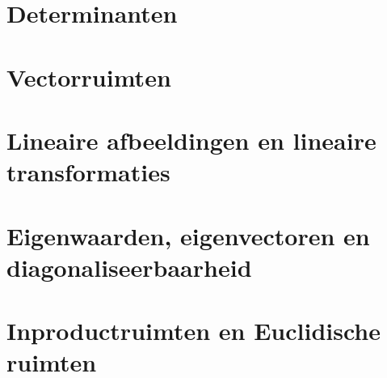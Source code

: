 \documentclass{exam} %
\begin{document}
\newpage

\section{Determinanten}

\vspace{0.5cm}



\newpage

\section{Vectorruimten}

\vspace{0.5cm}



\newpage

\section{Lineaire afbeeldingen en lineaire transformaties}

\vspace{0.5cm}



\newpage

\section{Eigenwaarden, eigenvectoren en diagonaliseerbaarheid}

\vspace{0.5cm}



\newpage

\section{Inproductruimten en Euclidische ruimten}

\vspace{0.5cm}


\end{document}
